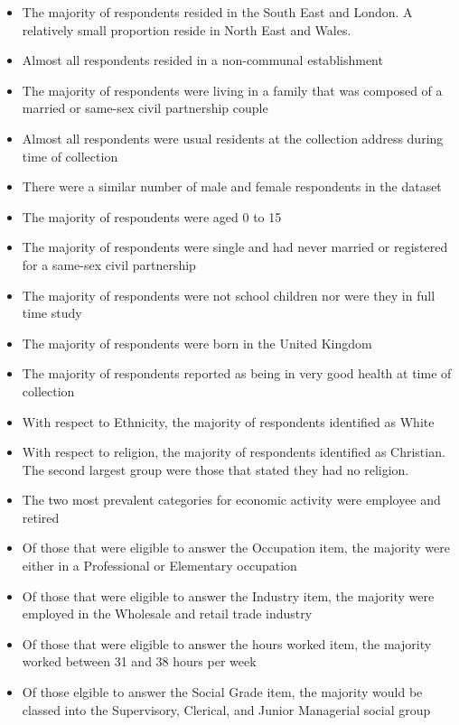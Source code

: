 \documentclass[]{book}
\providecommand{\tightlist}{%
  \setlength{\itemsep}{0pt}\setlength{\parskip}{0pt}}
\begin{document}
\begin{itemize}
\tightlist
\item
  The majority of respondents resided in the South East and London. A
  relatively small proportion reside in North East and Wales.\\
\item
  Almost all respondents resided in a non-communal establishment\\
\item
  The majority of respondents were living in a family that was composed
  of a married or same-sex civil partnership couple\\
\item
  Almost all respondents were usual residents at the collection address
  during time of collection\\
\item
  There were a similar number of male and female respondents in the
  dataset\\
\item
  The majority of respondents were aged 0 to 15\\
\item
  The majority of respondents were single and had never married or
  registered for a same-sex civil partnership
\item
  The majority of respondents were not school children nor were they in
  full time study
\item
  The majority of respondents were born in the United Kingdom\\
\item
  The majority of respondents reported as being in very good health at
  time of collection
\item
  With respect to Ethnicity, the majority of respondents identified as
  White\\
\item
  With respect to religion, the majority of respondents identified as
  Christian. The second largest group were those that stated they had no
  religion.\\
\item
  The two most prevalent categories for economic activity were employee
  and retired\\
\item
  Of those that were eligible to answer the Occupation item, the
  majority were either in a Professional or Elementary occupation\\
\item
  Of those that were eligible to answer the Industry item, the majority
  were employed in the Wholesale and retail trade industry\\
\item
  Of those that were eligible to answer the hours worked item, the
  majority worked between 31 and 38 hours per week\\
\item
  Of those elgible to answer the Social Grade item, the majority would
  be classed into the Supervisory, Clerical, and Junior Managerial
  social group
\end{itemize}
\end{document}
